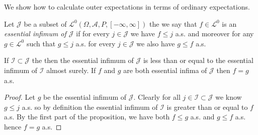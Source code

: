 We show how to calculate outer expectations in terms of ordinary expectations.
\begin{defn}Let $\mathcal{J}$ be a subset of $\mathcal{L}^0(\Omega, \mathcal{A}, P, [-\infty, \infty])$ the we say that $f \in \mathcal{L}^0$ is an \emph{essential infimum of $\mathcal{J}$} if 
for every $j \in \mathcal{J}$ we have $f \leq j$ a.s. and moreover for any $g \in \mathcal{L}^0$ such that $g \leq j$ a.s. for every $j \in \mathcal{J}$ we also have $g \leq f$ a.s.
\end{defn}

\begin{prop}\label{AlmostSureUniquenessEssentialInfimum}If $\mathcal{I} \subset \mathcal{J}$ the then the essential infimum of $\mathcal{J}$ is less than or equal to the essential infimum of $\mathcal{I}$ almost surely.  If $f$ and $g$ are both essential infima of $\mathcal{J}$ then $f = g$ a.s.
\end{prop}
\begin{proof}
Let $g$ be the essential infimum of $\mathcal{J}$.  Clearly for all $j \in \mathcal{I} \subset \mathcal{J}$ we know $g \leq j$ a.s.  so by definition the essential infimum of $\mathcal{I}$ is greater than or equal to $f$ a.s.  By the first part of the proposition, we have both $f \leq g$ a.s. and $g \leq f$ a.s. hence $f=g$ a.s.
\end{proof}

